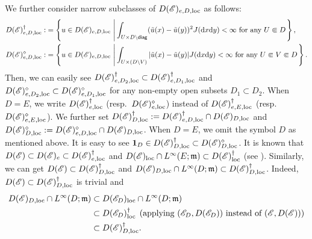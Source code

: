 \documentclass[12pt,a4paper]{article}
\renewcommand{\d}{\mathrm{d}}
\newcommand{\m}{\mathfrak{m} }
\newcommand{\loc}{{\rm loc}}
\newcommand{\1}{{\bf 1}}
\begin{document}
We further consider narrow subclasses of 
$D(\mathscr{E})_{e,D,\loc}$
as follows:
\begin{align*}
D(\mathscr{E})_{e,D,\loc}^{\dag}:&=
\left\{u\in D(\mathscr{E})_{e,D,\loc}\,\left|\, 
\int_{U\times D\setminus{\sf diag}}(\tilde{u}(x)-\tilde{u}(y))^2J({\d} x{\d} y)<\infty
\text{ for any }U\Subset D\right.\right\},\\
D(\mathscr{E})_{e,D,\loc}^{\diamond}:&
=\left\{u\in D(\mathscr{E})_{e,D,\loc}\,\left|\,
\int_{U\times (D\setminus V)}|\tilde{u}(x)-\tilde{u}(y)|J({\d} x{\d} y)<\infty\text{ for any }
U\Subset V\Subset D\right.\right\}.
\end{align*}
Then, we can easily see 
$D(\mathscr{E})_{e,D_2,\loc}^{\dag}\subset D(\mathscr{E})_{e,D_1,\loc}^{\dag}$ and $D(\mathscr{E})_{e,D_2,\loc}^{\diamond}\subset D(\mathscr{E})_{e,D_1,\loc}^{\diamond}$ for any non-empty open subsets $D_1\subset D_2$.
When $D=E$, we write $D(\mathscr{E})_{e,\loc}^{\dag}$ 
(resp.~$D(\mathscr{E})_{e,\loc}^{\diamond}$) instead of 
$D(\mathscr{E})_{e,E,\loc}^{\dag}$ (resp.~$D(\mathscr{E})_{e,E,\loc}^{\diamond}$). 
We further set $D(\mathscr{E})_{D,\loc}^{\dag}:=D(\mathscr{E})_{e,D,\loc}^{\dag}\cap D(\mathscr{E})_{D,\loc}$ and 
$D(\mathscr{E})_{D,\loc}^{\diamond}:=D(\mathscr{E})_{e,D,\loc}^{\diamond}\cap D(\mathscr{E})_{D,\loc}$. When $D=E$, we omit the symbol $D$ as mentioned above.  
It is easy to see $\1_D\in D(\mathscr{E})_{D,\loc}^{\dag}\subset 
D(\mathscr{E})_{D,\loc}^{\diamond}$.
It is known that $D(\mathscr{E})\subset D(\mathscr{E})_e\subset D(\mathscr{E})_{e,\loc}^{\dag}$ and 
$D(\mathscr{E})_{\loc}\cap L^{\infty}(E;{\m})\subset D(\mathscr{E})_{\loc}^{\dag}$ (see \cite[Remark~2.4(ii),(iii)]{CK}). 
Similarly, we can get $D(\mathscr{E})\subset D(\mathscr{E})_{D,\loc}^{\dag}$ and 
$D(\mathscr{E})_{D,\loc}\cap L^{\infty}(D;{\m})\subset D(\mathscr{E})_{D,\loc}^{\dag}$. Indeed, $D(\mathscr{E})\subset D(\mathscr{E})_{D,\loc}^{\dag}$ is trivial and  
\begin{align*}
D(\mathscr{E})_{D,\loc}\cap L^{\infty}(D;{\m})&\subset  
D(\mathscr{E}_D)_{\loc}\cap L^{\infty}(D;{\m})\\
&\subset D(\mathscr{E}_D)_{\loc}^{\dag}\;\,\text{(applying $(\mathscr{E}_D,D(\mathscr{E}_D))$ instead of $(\mathscr{E},D(\mathscr{E}))$)}\\
&\subset D(\mathscr{E})_{D,\loc}^{\dag}.
\end{align*}
 
\end{document}
